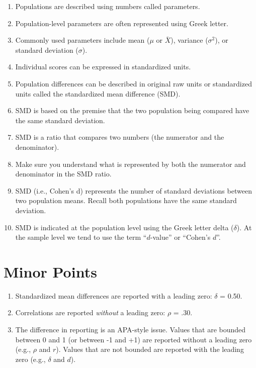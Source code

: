 \documentclass[
]{krantz}
\begin{document}
\begin{enumerate}
\def\labelenumi{\arabic{enumi}.}
\item
  Populations are described using numbers called parameters.
\item
  Population-level parameters are often represented using Greek letter.
\item
  Commonly used parameters include mean (\(\mu\) or \(\bar{X}\)), variance (\(\sigma^2\)), or standard deviation (\(\sigma\)).
\item
  Individual scores can be expressed in standardized units.
\item
  Population differences can be described in original raw units or standardized units called the standardized mean difference (SMD).
\item
  SMD is based on the premise that the two population being compared have the same standard deviation.
\item
  SMD is a ratio that compares two numbers (the numerator and the denominator).
\item
  Make sure you understand what is represented by both the numerator and denominator in the SMD ratio.
\item
  SMD (i.e., Cohen's d) represents the number of standard deviations between two population means. Recall both populations have the same standard deviation.
\item
  SMD is indicated at the population level using the Greek letter delta (\(\delta\)). At the sample level we tend to use the term ``\(d\)-value'' or ``Cohen's \(d\)''.
\end{enumerate}

\hypertarget{minor-points}{%
\section{Minor Points}\label{minor-points}}

\begin{enumerate}
\def\labelenumi{\arabic{enumi}.}
\item
  Standardized mean differences are reported with a leading zero: \(\delta\) = 0.50.
\item
  Correlations are reported \emph{without} a leading zero: \(\rho\) = .30.
\item
  The difference in reporting is an APA-style issue. Values that are bounded between 0 and 1 (or between -1 and +1) are reported without a leading zero (e.g., \(\rho\) and \(r\)). Values that are not bounded are reported with the leading zero (e.g., \(\delta\) and \(d\)).
\end{enumerate}
\end{document}
